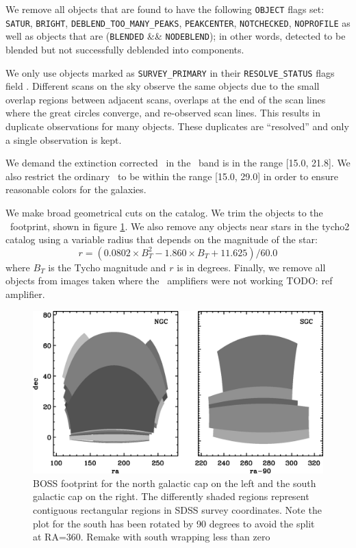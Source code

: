 \documentclass[preprint]{aastex}
\newcommand{\modelrmin}{15.0}
\newcommand{\modelrmax}{29.0}
\newcommand{\rmin}{15.0}
\newcommand{\rmax}{21.8}
\begin{document}
We remove all objects that are found to have the following \texttt{OBJECT}
flags set: \texttt{SATUR}, \texttt{BRIGHT}, \texttt{DEBLEND\_TOO\_MANY\_PEAKS},
\texttt{PEAKCENTER}, \texttt{NOTCHECKED}, \texttt{NOPROFILE} as well as objects
that are (\texttt{BLENDED} \&\& \texttt{NODEBLEND}); in other words, detected
to be blended but not successfully deblended into components. 

We only use objects marked as \texttt{SURVEY\_PRIMARY} in their
\texttt{RESOLVE\_STATUS} flags field \citep{dr7resolve}. Different scans on the
sky observe the same objects due to the small overlap regions between adjacent
scans, overlaps at the end of the scan lines where the great circles converge,
and re-observed scan lines.  This results in duplicate observations for many
objects.  These duplicates are ``resolved'' and only a single observation is
kept.

We demand the extinction corrected \citep{Schlegel98} \cmodelmag\ in the \rmag\
band is in the range [\rmin, \rmax].  We also restrict the ordinary \modelmag\
to be within the range [\modelrmin, \modelrmax] in order to ensure reasonable
colors for the galaxies.

We make broad geometrical cuts on the catalog.  We trim the objects to the
\boss\ footprint, shown in figure \ref{fig:footprint}. We also remove any
objects near stars in the tycho2 catalog \citep{tycho2} using a variable radius
that depends on the magnitude of the star:
\begin{equation}
r = (0.0802\times B_T^2 - 1.860\times B_T + 11.625)/60.0
\end{equation}
where $B_T$ is the Tycho magnitude and $r$ is in degrees.  Finally, we remove
all objects from images taken where the \umag\ amplifiers were not working
{\color{red}TODO: ref amplifier}.

\begin{figure}[t] \centering
 \centering 
 \includegraphics[scale=0.5]{figures/ngc-sgc-poly.eps}
 \caption{BOSS footprint for the north galactic cap on the left
 and the south galactic cap on the right.  The differently shaded
 regions represent contiguous rectangular regions in SDSS survey coordinates.
 Note the plot for the south has been rotated by 90 degrees to avoid
 the split at RA=360. {\color{red} Remake with south wrapping less than zero}}
 \label{fig:footprint}
\end{figure}
\end{document}
